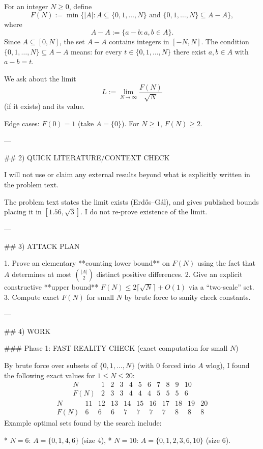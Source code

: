 For an integer $N\ge 0$, define
\[
F(N):=\min\bigl\{|A|: A\subseteq \{0,1,\dots,N\}\text{ and }\{0,1,\dots,N\}\subseteq A-A\bigr\},
\]
where
\[
A-A:=\{a-b: a,b\in A\}.
\]
Since $A\subseteq [0,N]$, the set $A-A$ contains integers in $[-N,N]$.
The condition $\{0,1,\dots,N\}\subseteq A-A$ means: for every $t\in\{0,1,\dots,N\}$ there exist $a,b\in A$ with $a-b=t$.

We ask about the limit
\[
L:=\lim_{N\to\infty}\frac{F(N)}{\sqrt N}
\]
(if it exists) and its value.

Edge cases: $F(0)=1$ (take $A=\{0\}$). For $N\ge 1$, $F(N)\ge 2$.

---

## 2) QUICK LITERATURE/CONTEXT CHECK

I will not use or claim any external results beyond what is explicitly written in the problem text.

The problem text states the limit exists (Erd\H{o}s–G\'al), and gives published bounds placing it in $[1.56,\sqrt3]$.
I do not re-prove existence of the limit.

---

## 3) ATTACK PLAN

1. Prove an elementary **counting lower bound** on $F(N)$ using the fact that $A$ determines at most $\binom{|A|}{2}$ distinct positive differences.
2. Give an explicit constructive **upper bound** $F(N)\le 2\lceil\sqrt N\rceil+O(1)$ via a “two-scale” set.
3. Compute exact $F(N)$ for small $N$ by brute force to sanity check constants.

---

## 4) WORK

### Phase 1: FAST REALITY CHECK (exact computation for small $N$)

By brute force over subsets of $\{0,1,\dots,N\}$ (with $0$ forced into $A$ wlog), I found the following exact values for $1\le N\le 20$:
\[
\begin{array}{c|cccccccccc}
N&1&2&3&4&5&6&7&8&9&10\\\hline
F(N)&2&3&3&4&4&4&5&5&5&6
\end{array}
\]
\[
\begin{array}{c|cccccccccc}
N&11&12&13&14&15&16&17&18&19&20\\\hline
F(N)&6&6&6&7&7&7&7&8&8&8
\end{array}
\]
Example optimal sets found by the search include:

* $N=6$: $A=\{0,1,4,6\}$ (size $4$),
* $N=10$: $A=\{0,1,2,3,6,10\}$ (size $6$).

